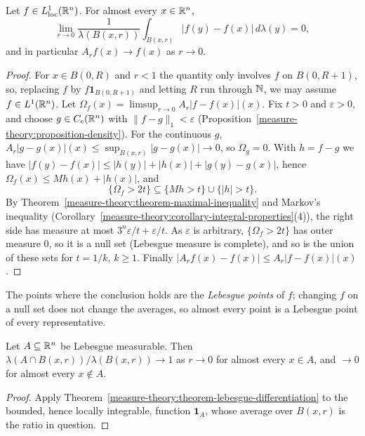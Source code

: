 \begin{theorem}\label{measure-theory:theorem-lebesgue-differentiation}
Let $f \in L^1_{\mathrm{loc}}(\mathbb{R}^n)$. For almost every $x \in \mathbb{R}^n$,
\[
\lim_{r \to 0}\frac{1}{\lambda(B(x, r))}\int_{B(x, r)}|f(y) - f(x)|\,d\lambda(y) = 0,
\]
and in particular $A_rf(x) \to f(x)$ as $r \to 0$.
\end{theorem}

\begin{proof}
For $x \in B(0, R)$ and $r < 1$ the quantity only involves $f$ on $B(0, R + 1)$, so, replacing $f$ by $f\mathbf{1}_{B(0, R+1)}$ and letting $R$ run through $\mathbb{N}$, we
may assume $f \in L^1(\mathbb{R}^n)$. Let $\Omega_f(x) = \limsup_{r \to 0}A_r|f - f(x)|(x)$. Fix $t > 0$ and $\varepsilon > 0$, and choose $g \in C_c(\mathbb{R}^n)$ with
$\|f - g\|_1 < \varepsilon$ (Proposition~\ref{measure-theory:proposition-density}). For the continuous $g$, $A_r|g - g(x)|(x) \leq \sup_{B(x, r)}|g - g(x)| \to 0$, so
$\Omega_g = 0$. With $h = f - g$ we have $|f(y) - f(x)| \leq |h(y)| + |h(x)| + |g(y) - g(x)|$, hence $\Omega_f(x) \leq Mh(x) + |h(x)|$, and
\[
\{\Omega_f > 2t\} \subseteq \{Mh > t\} \cup \{|h| > t\}.
\]
By Theorem~\ref{measure-theory:theorem-maximal-inequality} and Markov's inequality (Corollary~\ref{measure-theory:corollary-integral-properties}(4)), the right
side has measure at most $3^n\varepsilon/t + \varepsilon/t$. As $\varepsilon$ is arbitrary, $\{\Omega_f > 2t\}$ has outer measure $0$, so it is a null set (Lebesgue
measure is complete), and so is the union of these sets for $t = 1/k$, $k \geq 1$. Finally $|A_rf(x) - f(x)| \leq A_r|f - f(x)|(x)$.
\end{proof}

The points where the conclusion holds are the \emph{Lebesgue points} of $f$; changing $f$ on a null set does not change the averages, so almost every point is
a Lebesgue point of every representative.

\begin{corollary}\label{measure-theory:corollary-density}
Let $A \subseteq \mathbb{R}^n$ be Lebesgue measurable. Then $\lambda(A \cap B(x, r))/\lambda(B(x, r)) \to 1$ as $r \to 0$ for almost every $x \in A$, and $\to 0$ for almost
every $x \notin A$.
\end{corollary}

\begin{proof}
Apply Theorem~\ref{measure-theory:theorem-lebesgue-differentiation} to the bounded, hence locally integrable, function $\mathbf{1}_A$, whose average over $B(x, r)$ is
the ratio in question.
\end{proof}

